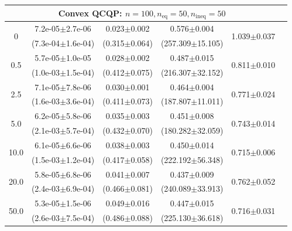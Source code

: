\documentclass{article}
\newcommand{\thinrule}{\midrule[0.1pt]}
\newcommand{\std}[1]{{\tiny$\pm${#1}}}
\begin{document}
\begin{table}[h]
\begin{tabular}{cccccc}
\midrule
\multicolumn{5}{c}{\textbf{Convex QCQP: \(n=100, n_{\mathrm{eq}}=50, n_{\mathrm{ineq}}=50\)}} \\
\midrule
\multirow{2}{*}{0} 
&7.2e-05\std{2.7e-06} 
& 0.023\std{0.002} 
& 0.576\std{0.004} 
& \multirow{2}{*}{1.039\std{0.037}}
\\ 
&(7.3e-04\std{1.6e-04}) 
& (0.315\std{0.064}) 
& (257.309\std{15.105}) & \\
\thinrule
\multirow{2}{*}{0.5} 
&5.7e-05\std{1.0e-05} 
& 0.028\std{0.002} 
& 0.487\std{0.015} 
& \multirow{2}{*}{0.811\std{0.010}}
\\ 
&(1.0e-03\std{1.5e-04}) 
& (0.412\std{0.075}) 
& (216.307\std{32.152}) & \\
\thinrule
\multirow{2}{*}{2.5} 
&7.1e-05\std{7.8e-06} 
& 0.030\std{0.001} 
& 0.464\std{0.004} 
& \multirow{2}{*}{0.771\std{0.024}}
\\ 
&(1.6e-03\std{3.6e-04}) 
& (0.411\std{0.073}) 
& (187.807\std{11.011}) & \\
\thinrule
\multirow{2}{*}{5.0}
&6.2e-05\std{5.8e-06} 
& 0.035\std{0.003} 
& 0.451\std{0.008} 
& \multirow{2}{*}{0.743\std{0.014}}
\\ 
&(2.1e-03\std{5.7e-04}) 
& (0.432\std{0.070}) 
& (180.282\std{32.059}) & \\ 
\thinrule
\multirow{2}{*}{10.0}
&6.1e-05\std{6.6e-06} 
& 0.038\std{0.003} 
& 0.450\std{0.014} 
& \multirow{2}{*}{0.715\std{0.006}}
\\ 
&(1.5e-03\std{1.2e-04}) 
& (0.417\std{0.058}) 
& (222.192\std{56.348}) & \\
\thinrule
\multirow{2}{*}{20.0}
&5.8e-05\std{6.8e-06} 
& 0.041\std{0.007} 
& 0.437\std{0.009} 
& \multirow{2}{*}{0.762\std{0.052}}
\\ 
&(2.4e-03\std{6.9e-04}) 
& (0.466\std{0.081}) 
& (240.089\std{33.913}) & \\
\thinrule
\multirow{2}{*}{50.0}
&5.3e-05\std{1.5e-06} 
& 0.049\std{0.016} 
& 0.447\std{0.015} 
& \multirow{2}{*}{0.716\std{0.031}}
\\ 
&(2.6e-03\std{7.5e-04}) 
& (0.486\std{0.088}) 
& (225.130\std{36.618}) & \\


\end{tabular}
\end{table}
\end{document}

